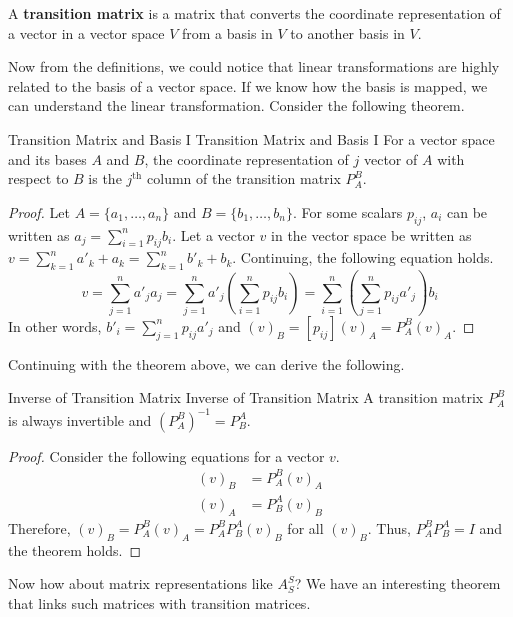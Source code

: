 \documentclass[../main.tex]{subfiles}
\begin{document}
\begin{definition}
A \textbf{transition matrix} is a matrix that converts the coordinate
representation of a vector in a vector space $V$ from a basis in $V$
to another basis in $V$.
\end{definition}

Now from the definitions, we could notice that linear transformations
are highly related to the basis of a vector space. If we know how
the basis is mapped, we can understand the linear transformation.
Consider the following theorem.

\begin{theorem}{Transition Matrix and Basis I}
{Transition Matrix and Basis I}
For a vector space and its bases $A$ and $B$, the coordinate
representation of $j$ vector of $A$ with respect to $B$ is the
$j^\text{th}$ column of the transition matrix $P_A^B$.
\end{theorem}
\begin{proof}
Let $A = \{ a_1, \ldots, a_n \}$ and $B = \{ b_1, \ldots, b_n \}$.
For some scalars $p_{ij}$, $a_i$ can be written as $a_j = \sum_{i=1}^n
p_{ij} b_i$. Let a vector $v$ in the vector space be written as $v =
\sum_{k=1}^n a'_k + a_k = \sum_{k=1}^n b'_k + b_k$. Continuing, the
following equation holds.
\[
v
= \sum_{j=1}^n a'_j a_j
= \sum_{j=1}^n a'_j \left( \sum_{i=1}^n p_{ij} b_i \right)
= \sum_{i=1}^n \left( \sum_{j=1}^n p_{ij} a'_j \right) b_i
\]
In other words, $b'_i = \sum_{j=1}^n p_{ij} a'_j$ and $(v)_B =
[p_{ij}] (v)_A = P_A^B (v)_A$.
\end{proof}

Continuing with the theorem above, we can derive the following.

\begin{theorem}{Inverse of Transition Matrix}
{Inverse of Transition Matrix}
A transition matrix $P_A^B$ is always invertible and $(P_A^B)^{-1}
= P_B^A$.
\end{theorem}
\begin{proof}
Consider the following equations for a vector $v$.
\begin{align*}
    (v)_B &= P_A^B (v)_A \\
    (v)_A &= P_B^A (v)_B
\end{align*}
Therefore, $(v)_B = P_A^B (v)_A = P_A^B P_B^A (v)_B$ for all $(v)_B$.
Thus, $P_A^B P_B^A = I$ and the theorem holds.
\end{proof}

Now how about matrix representations like $A_S^S$? We have an
interesting theorem that links such matrices with transition matrices.
\end{document}

